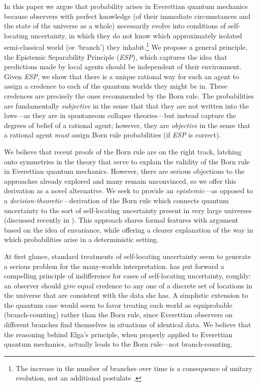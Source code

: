 \documentclass[12pt,onecolumn,secnumarabic,amsmath,amssymb,balancelastpage,nofootinbib]{article}
\begin{document}
In this paper we argue that probability arises in Everettian quantum mechanics because observers with perfect knowledge (of their immediate circumstances and the state of the universe as a whole) necessarily evolve into conditions of self-locating uncertainty, in which they do not know which approximately isolated semi-classical world (or `branch') they inhabit.\footnote{The increase in the number of branches over time is a consequence of unitary evolution, not an additional postulate \citep{wallace2003, wallace2010c}.}  We propose a general principle, the Epistemic Separability Principle (\emph{ESP}), which captures the idea that predictions made by local agents should be independent of their environment. Given \emph{ESP}, we show that there is a unique rational way for such an agent to assign a credence to each of the quantum worlds they might be in.  These credences are precisely the ones recommended by the Born rule.  The probabilities are fundamentally \emph{subjective} in the sense that that they are not written into the laws---as they are in spontaneous collapse theories---but instead capture the degrees of belief of a rational agent; however, they are \emph{objective} in the sense that a rational agent  \emph{must} assign Born rule probabilities (if \emph{ESP} is correct).

We believe that recent proofs of the Born rule \citep{deutsch1999, wallace2010b, zurek2005} are on the right track, latching onto symmetries in the theory that serve to explain the validity of the Born rule in Everettian quantum mechanics.  However, there are serious objections to the approaches already explored and many remain unconvinced, so we offer this derivation as a novel alternative.  We seek to provide an \emph{epistemic}---as opposed to a \emph{decision-theoretic}---derivation of the Born rule which connects quantum uncertainty to the sort of self-locating uncertainty present in very large universes (discussed recently in \citealp{hartle2007, page2007, srednicki2010}). This approach shares formal features with  \citeyearpar{zurek2003,zurek2003b,zurek2005} argument based on the idea of envariance, while offering a clearer explanation of the way in which probabilities arise in a deterministic setting.
 
At first glance, standard treatments of self-locating uncertainty seem to generate a serious problem for the many-worlds interpretation.  \citet{elga2004} has put forward a compelling principle of indifference for cases of self-locating uncertainty, roughly: an observer should give equal credence to any one of a discrete set of locations in the universe that are consistent with the data she has. A simplistic extension to the quantum case would seem to favor treating each world as equiprobable (branch-counting) rather than the Born rule, since Everettian observers on different branches find themselves in situations of identical data. We believe that the reasoning behind Elga's principle, when properly applied to Everettian quantum mechanics, actually leads to the Born rule---not branch-counting.  
\end{document}
